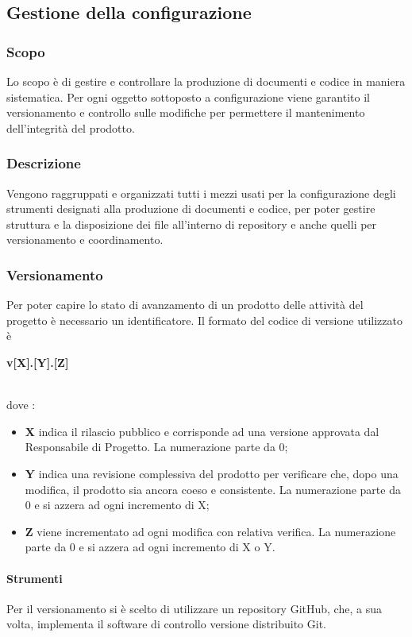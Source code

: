 \subsection{Gestione della configurazione}
\subsubsection{Scopo}
Lo scopo è di gestire e controllare la produzione di documenti e codice in maniera sistematica. Per ogni oggetto sottoposto a configurazione viene garantito il versionamento e controllo sulle modifiche per permettere il mantenimento dell'integrità del prodotto. 

\subsubsection{Descrizione}
Vengono raggruppati e organizzati tutti i mezzi usati per la configurazione degli strumenti designati alla produzione di documenti e codice, per poter gestire struttura e la disposizione dei file all’interno di repository e anche  quelli per versionamento e coordinamento.

\subsubsection{Versionamento}
Per poter capire lo stato di avanzamento di un prodotto delle attività del progetto è necessario un identificatore. Il formato del codice di versione utilizzato è \\
\centerline{\textbf{v[X].[Y].[Z]}} \\ 
dove :
\begin{itemize}
\item \textbf{X} indica il rilascio pubblico e corrisponde ad una versione approvata dal Responsabile di Progetto. La numerazione parte da 0;
\item \textbf{Y} indica una revisione complessiva del prodotto per verificare che, dopo una modifica, il prodotto sia ancora coeso e consistente. La numerazione parte da 0 e si azzera ad ogni incremento di X;
\item \textbf{Z} viene incrementato ad ogni modifica con relativa verifica. La numerazione parte da 0 e si azzera ad ogni incremento di X o Y.
\end{itemize}

\paragraph{Strumenti}
Per il versionamento si è scelto di utilizzare un repository GitHub, che, a sua volta, implementa il software di controllo versione distribuito Git.

